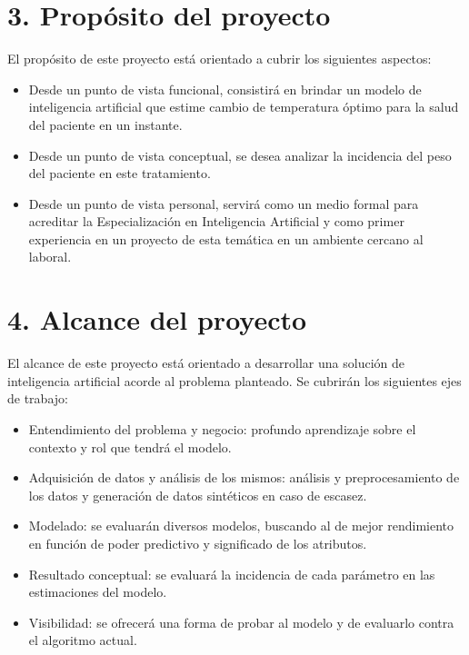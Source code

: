 \documentclass[
11pt, %
]{charter}
\begin{document}
\section{3. Propósito del proyecto}
\label{sec:proposito}
	
El propósito de este proyecto está orientado a cubrir los siguientes aspectos:
\begin{itemize}
	\item Desde un punto de vista funcional, consistirá en brindar un modelo de inteligencia artificial que estime cambio de temperatura óptimo para la salud del paciente en un instante.
	\item Desde un punto de vista conceptual, se desea analizar la incidencia del peso del paciente en este tratamiento.
	\item Desde un punto de vista personal, servirá como un medio formal para acreditar la Especialización en Inteligencia Artificial y como primer experiencia en un proyecto de esta temática en un ambiente cercano al laboral.	
\end{itemize}



\section{4. Alcance del proyecto}
\label{sec:alcance}

El alcance de este proyecto está orientado a desarrollar una solución de inteligencia artificial acorde al problema planteado. Se cubrirán los siguientes ejes de trabajo:

\begin{itemize}
	\item Entendimiento del problema y negocio: profundo aprendizaje sobre el contexto y rol que tendrá el modelo.
	\item Adquisición de datos y análisis de los mismos: análisis y preprocesamiento de los datos y generación de datos sintéticos en caso de escasez.
	\item Modelado: se evaluarán diversos modelos, buscando al de mejor rendimiento en función de poder predictivo y significado de los atributos.
	\item Resultado conceptual: se evaluará la incidencia de cada parámetro en las estimaciones del modelo.
	\item Visibilidad: se ofrecerá una forma de probar al modelo y de evaluarlo contra el algoritmo actual.
\end{itemize}
\end{document}

